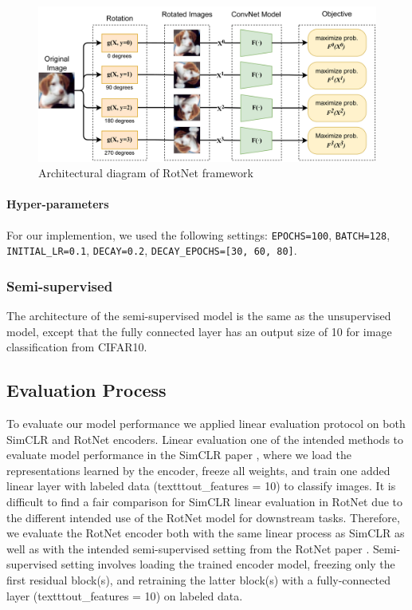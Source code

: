 \begin{figure}[!htbp]
    \centering
    \includegraphics[width=.80\linewidth]{figs/archDiag_RotNet.png}
    \caption{Architectural diagram of RotNet framework}
    \label{fig:archDiag_RotNet}
\end{figure}

\paragraph{Hyper-parameters} For our implemention, we used the following settings: \texttt{EPOCHS=100}, \texttt{BATCH=128}, \texttt{INITIAL\_LR=0.1}, \texttt{DECAY=0.2}, \texttt{DECAY\_EPOCHS=[30, 60, 80]}. 

\subsubsection{Semi-supervised}

The architecture of the semi-supervised model is the same as the unsupervised model, except that the fully connected layer has an output size of 10 for image classification from CIFAR10.

\subsection{Evaluation Process}

To evaluate our model performance we applied linear evaluation protocol on both SimCLR and RotNet encoders. Linear evaluation one of the intended methods to evaluate model performance in the SimCLR paper \cite{SimCLR}, where we load the representations learned by the encoder, freeze all weights, and train one added linear layer with labeled data (texttt{out\_features = 10}) to classify images. It is difficult to find a fair comparison for SimCLR linear evaluation in RotNet due to the different intended use of the RotNet model for downstream tasks. Therefore, we evaluate the RotNet encoder both with the same linear process as SimCLR as well as with the intended semi-supervised setting from the RotNet paper \cite{RotNet}. Semi-supervised setting involves loading the trained encoder model, freezing only the first residual block(s), and retraining the latter block(s) with a fully-connected layer (texttt{out\_features = 10}) on labeled data.

